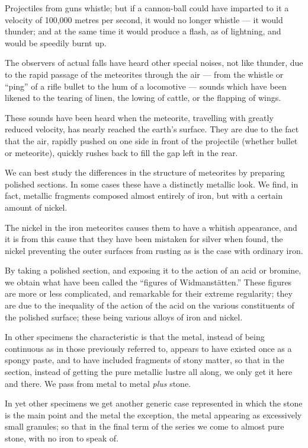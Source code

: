 \documentclass[a4paper, 12pt, oneside, polutonikogreek, english]{article}
\begin{document}
Projectiles from guns whistle; but if a cannon-ball could have imparted to it a velocity of 100,000 metres per second, it would no longer whistle --- it would thunder; and at the same time it would produce a flash, as of lightning, and would be speedily burnt up.

The observers of actual falls have heard other special noises, not like thunder, due to the rapid passage of the meteorites through the air --- from the whistle or ``ping'' of a rifle bullet to the hum of a locomotive --- sounds which have been likened to the tearing of linen, the lowing of cattle, or the flapping of wings.

These sounds have been heard when the meteorite, travelling with greatly reduced velocity, has nearly reached the earth's surface. They are due to the fact that the air, rapidly pushed on one side in front of the projectile (whether bullet or meteorite), quickly rushes back to fill the gap left in the rear.

We can best study the differences in the structure of meteorites by preparing polished sections. In some cases these have a distinctly metallic look. We find, in fact, metallic fragments composed almost entirely of iron, but with a certain amount of nickel.

The nickel in the iron meteorites causes them to have a whitish appearance, and it is from this cause that they have been mistaken for silver when found, the nickel preventing the outer surfaces from rusting as is the case with ordinary iron.

By taking a polished section, and exposing it to the action of an acid or bromine, we obtain what have been called the ``figures of Widmanstätten.'' These figures are more or less complicated, and remarkable for their extreme regularity; they are due to the inequality of the action of the acid on the various constituents of the polished surface; these being various alloys of iron and nickel.

In other specimens the characteristic is that the metal, instead of being continuous as in those previously referred to, appears to have existed once as a spongy paste, and to have included fragments of stony matter, so that in the section, instead of getting the pure metallic lustre all along, we only get it here and there. We pass from metal to metal \emph{plus} stone.

In yet other specimens we get another generic case represented in which the stone is the main point and the metal the exception, the metal appearing as excessively small granules; so that in the final term of the series we come to almost pure stone, with no iron to speak of.
\end{document}
